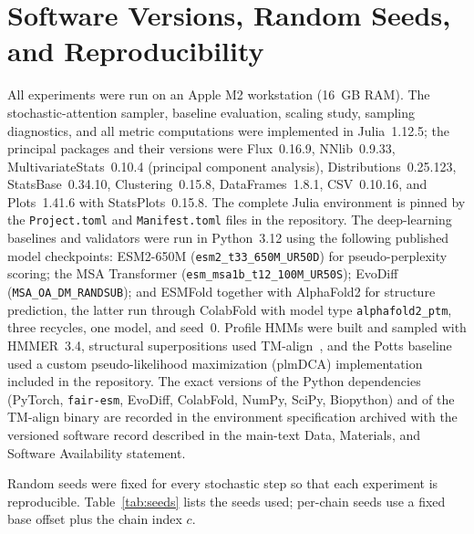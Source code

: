 \documentclass[10pt]{article}
\begin{document}
\section{Software Versions, Random Seeds, and Reproducibility}\label{si:reproducibility}

All experiments were run on an Apple M2 workstation (16~GB RAM). The stochastic-attention sampler, baseline evaluation, scaling study, sampling diagnostics, and all metric computations were implemented in Julia~1.12.5; the principal packages and their versions were Flux~0.16.9, NNlib~0.9.33, MultivariateStats~0.10.4 (principal component analysis), Distributions~0.25.123, StatsBase~0.34.10, Clustering~0.15.8, DataFrames~1.8.1, CSV~0.10.16, and Plots~1.41.6 with StatsPlots~0.15.8. The complete Julia environment is pinned by the \texttt{Project.toml} and \texttt{Manifest.toml} files in the repository. The deep-learning baselines and validators were run in Python~3.12 using the following published model checkpoints: ESM2-650M (\texttt{esm2\_t33\_650M\_UR50D}) for pseudo-perplexity scoring; the MSA Transformer (\texttt{esm\_msa1b\_t12\_100M\_UR50S}); EvoDiff (\texttt{MSA\_OA\_DM\_RANDSUB}); and ESMFold together with AlphaFold2 for structure prediction, the latter run through ColabFold with model type \texttt{alphafold2\_ptm}, three recycles, one model, and seed~0. Profile HMMs were built and sampled with HMMER~3.4, structural superpositions used TM-align~\cite{zhangTMalign2005}, and the Potts baseline used a custom pseudo-likelihood maximization (plmDCA) implementation included in the repository. The exact versions of the Python dependencies (PyTorch, \texttt{fair-esm}, EvoDiff, ColabFold, NumPy, SciPy, Biopython) and of the TM-align binary are recorded in the environment specification archived with the versioned software record described in the main-text Data, Materials, and Software Availability statement.

Random seeds were fixed for every stochastic step so that each experiment is reproducible. Table~\ref{tab:seeds} lists the seeds used; per-chain seeds use a fixed base offset plus the chain index $c$.
\end{document}
